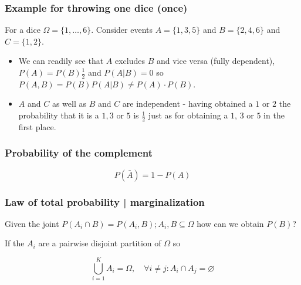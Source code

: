 \subsubsection{Example for throwing one dice (once)}
For a dice $\Omega = \{1,\dots,6\}$. Consider events $A = \{1,3,5\}$ and $B = \{2,4,6\}$ and $C = \{1,2\}$.

\begin{itemize}
    \item We can readily see that $A$ excludes $B$ and vice versa (fully dependent), $P(A) = P(B) \frac{1}{2}$ and
    $P(A|B) = 0$ so $P(A,B) = P(B) P(A|B) \neq P(A) \cdot P(B)$.
    \item $A$ and $C$ as well as $B$ and $C$ are independent - having obtained a $1$ or $2$ the probability that
    it is a $1,3$ or $5$ is $\frac{1}{2}$ just as for obtaining a $1$, $3$ or $5$ in the first place.
\end{itemize}

\subsubsection{Probability of the complement}
\begin{equation}
    P(\bar{A}) = 1 - P(A)
\end{equation}


\subsubsection{Law of total probability | marginalization}
Given the joint $P(A_i \cap B) = P(A_i,B); A_i,B \subseteq \Omega$ how can we obtain $P(B)$?

If the $A_i$ are a pairwise disjoint partition of $\Omega$ so

\begin{equation}
    \bigcup_{i=1}^K A_i=\Omega, \quad \forall i \neq j: A_i \cap A_j=\varnothing
\end{equation}

